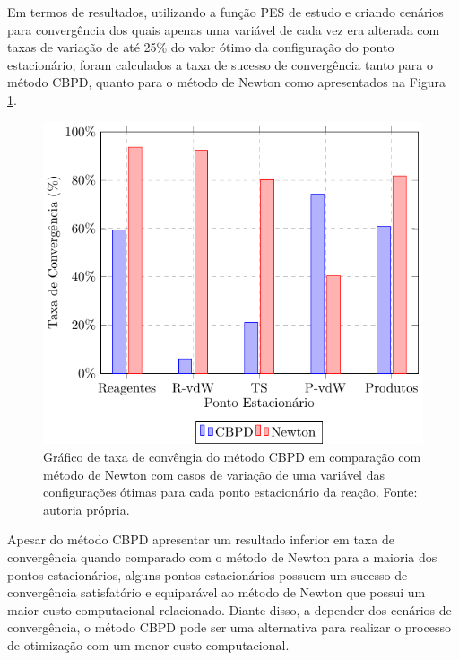 \documentclass{pssbmac}
\begin{document}
Em termos de resultados, utilizando a função PES de estudo e criando cenários para convergência dos quais apenas uma variável de cada vez era alterada com taxas de variação de até 25\% do valor ótimo da configuração do ponto estacionário, foram calculados a taxa de sucesso de convergência tanto para o método CBPD, quanto para o método de Newton como apresentados na Figura \ref{figura01}.
%
\begin{figure}[H]
\centering
\includegraphics[width=.475\textwidth]{image}
\caption{ {\small Gráfico de taxa de convêngia do método CBPD em comparação com método de Newton com casos de variação de uma variável das configurações ótimas para cada ponto estacionário da reação. Fonte: autoria própria.}}
\label{figura01}
\end{figure}
%
Apesar do método CBPD apresentar um resultado inferior em taxa de convergência quando comparado com o método de Newton para a maioria dos pontos estacionários, alguns pontos estacionários possuem um sucesso de convergência satisfatório e equiparável ao método de Newton que possui um maior custo computacional relacionado. Diante disso, a depender dos cenários de convergência, o método CBPD pode ser uma alternativa para realizar o processo de otimização com um menor custo computacional.

\printbibliography
\end{document}
